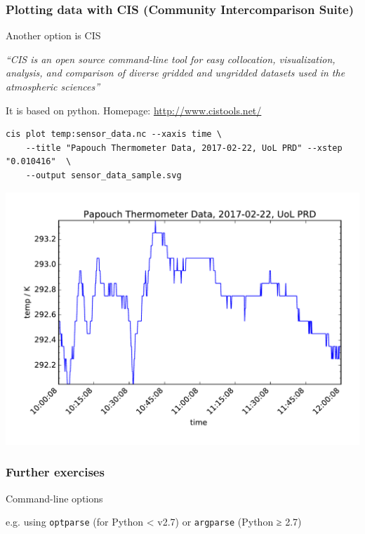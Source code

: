 \documentclass[aspectratio=1610,9pt]{beamer} %
\begin{document}
\begin{frame}[fragile]
\frametitle{Plotting data with CIS (Community Intercomparison
Suite)}

Another option is CIS

\emph{``CIS is an open source command-line tool for easy collocation,
visualization, analysis, and comparison of diverse gridded and ungridded
datasets used in the atmospheric sciences''}

It is based on python. Homepage:
\url{http://www.cistools.net/}

\begin{verbatim}
cis plot temp:sensor_data.nc --xaxis time \ 
    --title "Papouch Thermometer Data, 2017-02-22, UoL PRD" --xstep "0.010416"  \ 
    --output sensor_data_sample.svg
\end{verbatim}
\end{frame}
\begin{frame}

\includegraphics[width=\textwidth]{sensor_data_sample}

\end{frame}
\begin{frame}
\frametitle{Further exercises}

\begin{block}{Command-line options}

e.g. using \texttt{optparse} (for Python \textless{} v2.7) or
\texttt{argparse} (Python ≥ 2.7)
\end{block}
\end{frame}
\end{document}
